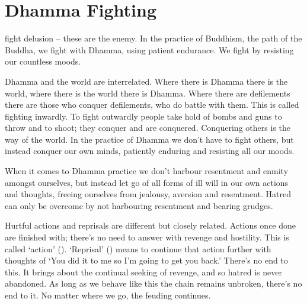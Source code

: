 
\chapter{Dhamma Fighting}

 fight delusion -- these are the enemy. In the practice of Buddhism, the path of the Buddha, we fight with Dhamma, using patient endurance. We fight by resisting our countless moods.

Dhamma and the world are interrelated. Where there is Dhamma there is the world, where there is the world there is Dhamma. Where there are defilements there are those who conquer defilements, who do battle with them. This is called fighting inwardly. To fight outwardly people take hold of bombs and guns to throw and to shoot; they conquer and are conquered. Conquering others is the way of the world. In the practice of Dhamma we don't have to fight others, but instead conquer our own minds, patiently enduring and resisting all our moods.

When it comes to Dhamma practice we don't harbour resentment and enmity amongst ourselves, but instead let go of all forms of ill will in our own actions and thoughts, freeing ourselves from jealousy, aversion and resentment. Hatred can only be overcome by not harbouring resentment and bearing grudges.

Hurtful actions and reprisals are different but closely related. Actions once done are finished with; there's no need to answer with revenge and hostility. This is called `action' (). `Reprisal' () means to continue that action further with thoughts of `You did it to me so I'm going to get you back.' There's no end to this. It brings about the continual seeking of revenge, and so hatred is never abandoned. As long as we behave like this the chain remains unbroken, there's no end to it. No matter where we go, the feuding continues.

